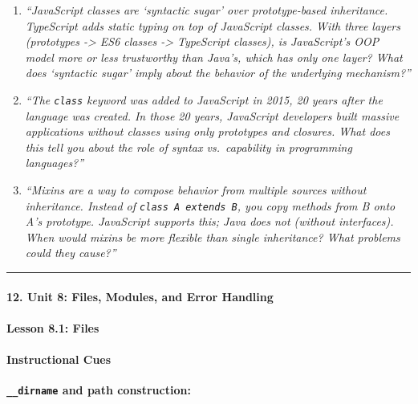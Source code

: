 \documentclass[
  justified,
  openright,
]{tufte-book}
\let\subsection\paragraph
\let\paragraph\paragraph
\let\subsection\paragraph
\let\paragraph\paragraph
\begin{document}
\begin{enumerate}
\def\labelenumi{\arabic{enumi}.}
\item
  \emph{``JavaScript classes are `syntactic sugar' over prototype-based
  inheritance. TypeScript adds static typing on top of JavaScript
  classes. With three layers (prototypes -\textgreater{} ES6 classes
  -\textgreater{} TypeScript classes), is JavaScript's OOP model more or
  less trustworthy than Java's, which has only one layer? What does
  `syntactic sugar' imply about the behavior of the underlying
  mechanism?''}
\item
  \emph{``The \texttt{class} keyword was added to JavaScript in 2015, 20
  years after the language was created. In those 20 years, JavaScript
  developers built massive applications without classes using only
  prototypes and closures. What does this tell you about the role of
  syntax vs.~capability in programming languages?''}
\item
  \emph{``Mixins are a way to compose behavior from multiple sources
  without inheritance. Instead of \texttt{class\ A\ extends\ B}, you
  copy methods from B onto A's prototype. JavaScript supports this; Java
  does not (without interfaces). When would mixins be more flexible than
  single inheritance? What problems could they cause?''}
\end{enumerate}

\begin{center}\rule{0.5\linewidth}{0.5pt}\end{center}

\subsection{12. Unit 8: Files, Modules, and Error
Handling}\label{unit-8-files-modules-and-error-handling}

\subsection{Lesson 8.1: Files}\label{lesson-8.1-files}

\paragraph{Instructional Cues}\label{instructional-cues-19}

\textbf{\texttt{\_\_dirname} and path construction:}
\end{document}
